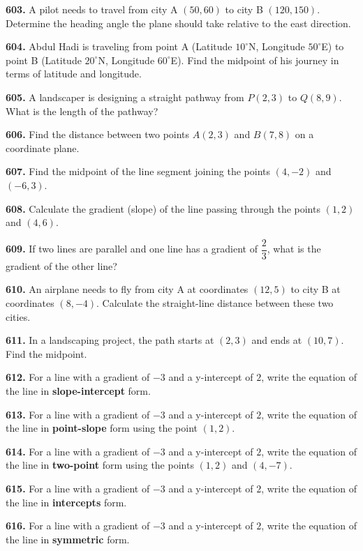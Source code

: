 \documentclass[11pt]{article}
\begin{document}
\bigskip
\noindent\textbf{603.} A pilot needs to travel from city A $(50,60)$ to city B $(120,150)$. Determine the heading angle the plane should take relative to the east direction.

\bigskip
\noindent\textbf{604.} Abdul Hadi is traveling from point A (Latitude $10^{\circ}$N, Longitude $50^{\circ}$E) to point B (Latitude $20^{\circ}$N, Longitude $60^{\circ}$E). Find the midpoint of his journey in terms of latitude and longitude.

\bigskip
\noindent\textbf{605.} A landscaper is designing a straight pathway from $P(2,3)$ to $Q(8,9)$. What is the length of the pathway?

\bigskip
\noindent\textbf{606.} Find the distance between two points $A(2,3)$ and $B(7,8)$ on a coordinate plane.

\bigskip
\noindent\textbf{607.} Find the midpoint of the line segment joining the points $(4,-2)$ and $(-6,3)$.

\bigskip
\noindent\textbf{608.} Calculate the gradient (slope) of the line passing through the points $(1,2)$ and $(4,6)$.

\bigskip
\noindent\textbf{609.} If two lines are parallel and one line has a gradient of $\dfrac{2}{3}$, what is the gradient of the other line?

\bigskip
\noindent\textbf{610.} An airplane needs to fly from city A at coordinates $(12,5)$ to city B at coordinates $(8,-4)$. Calculate the straight-line distance between these two cities.

\bigskip
\noindent\textbf{611.} In a landscaping project, the path starts at $(2,3)$ and ends at $(10,7)$. Find the midpoint.

\bigskip
\noindent\textbf{612.} For a line with a gradient of $-3$ and a y-intercept of $2$, write the equation of the line in \textbf{slope-intercept} form.

\bigskip
\noindent\textbf{613.} For a line with a gradient of $-3$ and a y-intercept of $2$, write the equation of the line in \textbf{point-slope} form using the point $(1,2)$.

\bigskip
\noindent\textbf{614.} For a line with a gradient of $-3$ and a y-intercept of $2$, write the equation of the line in \textbf{two-point} form using the points $(1,2)$ and $(4,-7)$.

\bigskip
\noindent\textbf{615.} For a line with a gradient of $-3$ and a y-intercept of $2$, write the equation of the line in \textbf{intercepts} form.

\bigskip
\noindent\textbf{616.} For a line with a gradient of $-3$ and a y-intercept of $2$, write the equation of the line in \textbf{symmetric} form.
\end{document}
